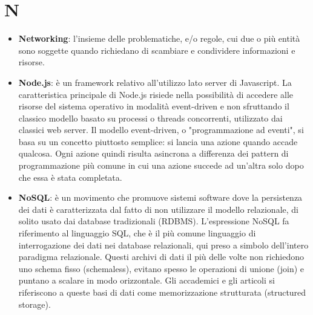 \section{N}
\begin{itemize}
	\item
	\textbf{Networking}:  l’insieme delle problematiche, e/o regole, cui due o più entità sono soggette quando richiedano di scambiare e condividere informazioni e risorse.  
	\item
	\textbf{Node.js}:  è un framework relativo all'utilizzo lato server di Javascript.
	 La caratteristica principale di Node.js risiede nella possibilità di accedere alle risorse del sistema operativo in modalità event-driven e non sfruttando il classico modello basato su processi o threads concorrenti, utilizzato dai classici web server. Il modello event-driven, o "programmazione ad eventi", si basa su un concetto piuttosto semplice: si lancia una azione quando accade qualcosa. Ogni azione quindi risulta asincrona a differenza dei pattern di programmazione più comune in cui una azione succede ad un'altra solo dopo che essa è stata completata.
	 \item
	 \textbf{NoSQL}: è un movimento che promuove sistemi software dove la persistenza dei dati è caratterizzata dal fatto di non utilizzare il modello relazionale, di solito usato dai database tradizionali (RDBMS). L'espressione NoSQL fa riferimento al linguaggio SQL, che è il più comune linguaggio di interrogazione dei dati nei database relazionali, qui preso a simbolo dell'intero paradigma relazionale.
	 Questi archivi di dati il più delle volte non richiedono uno schema fisso (schemaless), evitano spesso le operazioni di unione (join) e puntano a scalare in modo orizzontale. Gli accademici e gli articoli si riferiscono a queste basi di dati come memorizzazione strutturata (structured storage).
\end{itemize}